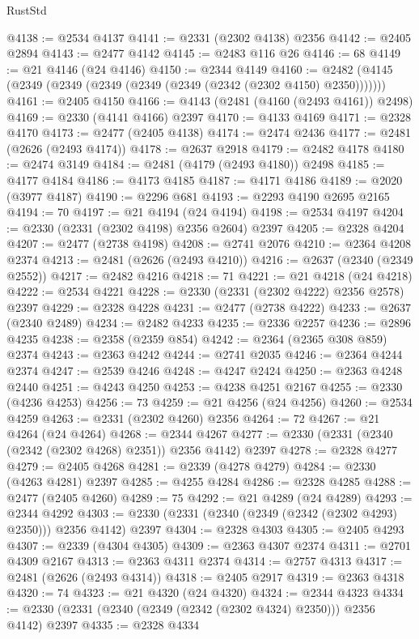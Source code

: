 \begin{lexlean}{RustStd}
\begin{coremodule}
@4138 := @2534 @4137
@4141 := @2331 (@2302 @4138) @2356
@4142 := @2405 @2894
@4143 := @2477 @4142
@4145 := @2483 @116 @26
@4146 := 68
@4149 := @21 @4146 (@24 @4146)
@4150 := @2344 @4149
@4160 := @2482 (@4145 (@2349 (@2349 (@2349 (@2349 (@2349 (@2342 (@2302 @4150) @2350)))))))
@4161 := @2405 @4150
@4166 := @4143 (@2481 (@4160 (@2493 @4161)) @2498)
@4169 := @2330 (@4141 @4166) @2397
@4170 := @4133 @4169
@4171 := @2328 @4170
@4173 := @2477 (@2405 @4138)
@4174 := @2474 @2436
@4177 := @2481 (@2626 (@2493 @4174))
@4178 := @2637 @2918
@4179 := @2482 @4178
@4180 := @2474 @3149
@4184 := @2481 (@4179 (@2493 @4180)) @2498
@4185 := @4177 @4184
@4186 := @4173 @4185
@4187 := @4171 @4186
@4189 := @2020 (@3977 @4187)
@4190 := @2296 @681
@4193 := @2293 @4190 @2695 @2165
@4194 := 70
@4197 := @21 @4194 (@24 @4194)
@4198 := @2534 @4197
@4204 := @2330 (@2331 (@2302 @4198) @2356 @2604) @2397
@4205 := @2328 @4204
@4207 := @2477 (@2738 @4198)
@4208 := @2741 @2076
@4210 := @2364 @4208 @2374
@4213 := @2481 (@2626 (@2493 @4210))
@4216 := @2637 (@2340 (@2349 @2552))
@4217 := @2482 @4216
@4218 := 71
@4221 := @21 @4218 (@24 @4218)
@4222 := @2534 @4221
@4228 := @2330 (@2331 (@2302 @4222) @2356 @2578) @2397
@4229 := @2328 @4228
@4231 := @2477 (@2738 @4222)
@4233 := @2637 (@2340 @2489)
@4234 := @2482 @4233
@4235 := @2336 @2257
@4236 := @2896 @4235
@4238 := @2358 (@2359 @854)
@4242 := @2364 (@2365 @308 @859) @2374
@4243 := @2363 @4242
@4244 := @2741 @2035
@4246 := @2364 @4244 @2374
@4247 := @2539 @4246
@4248 := @4247 @2424
@4250 := @2363 @4248 @2440
@4251 := @4243 @4250
@4253 := @4238 @4251 @2167
@4255 := @2330 (@4236 @4253)
@4256 := 73
@4259 := @21 @4256 (@24 @4256)
@4260 := @2534 @4259
@4263 := @2331 (@2302 @4260) @2356
@4264 := 72
@4267 := @21 @4264 (@24 @4264)
@4268 := @2344 @4267
@4277 := @2330 (@2331 (@2340 (@2342 (@2302 @4268) @2351)) @2356 @4142) @2397
@4278 := @2328 @4277
@4279 := @2405 @4268
@4281 := @2339 (@4278 @4279)
@4284 := @2330 (@4263 @4281) @2397
@4285 := @4255 @4284
@4286 := @2328 @4285
@4288 := @2477 (@2405 @4260)
@4289 := 75
@4292 := @21 @4289 (@24 @4289)
@4293 := @2344 @4292
@4303 := @2330 (@2331 (@2340 (@2349 (@2342 (@2302 @4293) @2350))) @2356 @4142) @2397
@4304 := @2328 @4303
@4305 := @2405 @4293
@4307 := @2339 (@4304 @4305)
@4309 := @2363 @4307 @2374
@4311 := @2701 @4309 @2167
@4313 := @2363 @4311 @2374
@4314 := @2757 @4313
@4317 := @2481 (@2626 (@2493 @4314))
@4318 := @2405 @2917
@4319 := @2363 @4318
@4320 := 74
@4323 := @21 @4320 (@24 @4320)
@4324 := @2344 @4323
@4334 := @2330 (@2331 (@2340 (@2349 (@2342 (@2302 @4324) @2350))) @2356 @4142) @2397
@4335 := @2328 @4334

\end{coremodule}
\end{lexlean}
